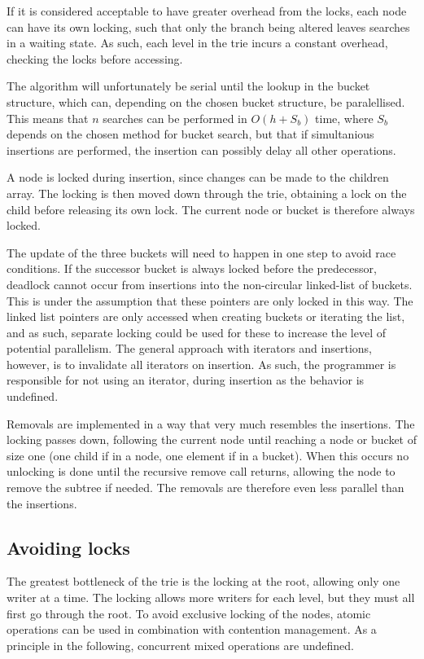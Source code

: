 If it is considered acceptable to have greater overhead from the locks, each
node can have its own locking, such that only the branch being altered
leaves searches in a waiting state. As such, each level in the trie incurs a
constant overhead, checking the locks before accessing.

The algorithm will unfortunately be serial until the lookup in the bucket
structure, which can, depending on the chosen bucket structure, be
paralellised. This means that $n$ searches can be performed in $O(h+S_b)$ time,
where $S_b$ depends on the chosen method for bucket search, but that if
simultanious insertions are performed, the insertion can possibly delay all
other operations. 

A node is locked during insertion, since changes can be made to the children
array. The locking is then moved down through the trie, obtaining a lock on
the child before releasing its own lock. The current node or bucket is
therefore always locked.

The update of the three buckets will need to happen in one
step to avoid race conditions. If the successor bucket is always locked before
the predecessor, deadlock cannot occur from insertions into the non-circular
linked-list of buckets. This is under the assumption that these pointers are
only locked in this way. The linked list pointers are only accessed when
creating buckets or iterating the list, and as such, separate locking could be
used for these to increase the level of potential parallelism. The general
approach with iterators and insertions, however, is to invalidate all iterators
on insertion. As such, the programmer is responsible for not using an iterator,
during insertion as the behavior is undefined.

Removals are implemented in a way that very much resembles the insertions. The
locking passes down, following the current node until reaching a node or bucket
of size one (one child if in a node, one element if in a bucket). When this
occurs no unlocking is done until the recursive remove call returns, allowing
the node to remove the subtree if needed. The removals are therefore even less
parallel than the insertions.

\subsection{Avoiding locks}
The greatest bottleneck of the trie is the locking at the root, allowing only
one writer at a time. The locking allows more writers for each level, but they
must all first go through the root. To avoid exclusive locking of the nodes,
atomic operations can be used in combination with contention management.
As a principle in the following, concurrent mixed operations are undefined.

